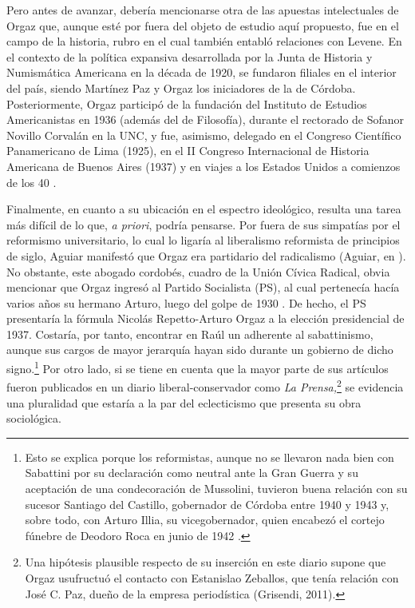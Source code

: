 Pero antes de avanzar, debería mencionarse otra de las apuestas intelectuales de Orgaz que, aunque esté por fuera del objeto de estudio aquí propuesto, fue en el campo de la historia, rubro en el cual también entabló relaciones con Levene. En el contexto de la política expansiva desarrollada por la Junta de Historia y Numismática Americana en la década de 1920, se fundaron filiales en el interior del país, siendo Martínez Paz y Orgaz los iniciadores de la de Córdoba. Posteriormente, Orgaz participó de la fundación del Instituto de Estudios Americanistas en 1936 (además del de Filosofía), durante el rectorado de Sofanor Novillo Corvalán en la UNC, y fue, asimismo, delegado en el Congreso Científico Panamericano de Lima (1925), en el II Congreso Internacional de Historia Americana de Buenos Aires (1937) y en viajes a los Estados Unidos a comienzos de los 40 \parencite{1528-REQUENA2010}.

Finalmente, en cuanto a su ubicación en el espectro ideológico, resulta una tarea más difícil de lo que, \emph{a priori}, podría pensarse. Por fuera de sus simpatías por el reformismo universitario, lo cual lo ligaría al liberalismo reformista de principios de siglo, Aguiar manifestó que Orgaz era partidario del radicalismo (Aguiar, en \cite{1544-ORGAZ1960}). No obstante, este abogado cordobés, cuadro de la Unión Cívica Radical, obvia mencionar que Orgaz ingresó al Partido Socialista (PS), al cual pertenecía hacía varios años su hermano Arturo, luego del golpe de 1930 \parencite{1507-TCACH2012}. De hecho, el PS presentaría la fórmula Nicolás Repetto-Arturo Orgaz a la elección presidencial de 1937. Costaría, por tanto, encontrar en Raúl un adherente al sabattinismo, aunque sus cargos de mayor jerarquía hayan sido durante un gobierno de dicho signo.\footnote{Esto se explica porque los reformistas, aunque no se llevaron nada bien con Sabattini por su declaración como neutral ante la Gran Guerra y su aceptación de una condecoración de Mussolini, tuvieron buena relación con su sucesor Santiago del Castillo, gobernador de Córdoba entre 1940 y 1943 y, sobre todo, con Arturo Illia, su vicegobernador, quien encabezó el cortejo fúnebre de Deodoro Roca en junio de 1942 \parencite{1624-FERRERO1984}.} Por otro lado, si se tiene en cuenta que la mayor parte de sus artículos fueron publicados en un diario liberal-conservador como \emph{La Prensa,}\footnote{Una hipótesis plausible respecto de su inserción en este diario supone que Orgaz usufructuó el contacto con Estanislao Zeballos, que tenía relación con José C. Paz, dueño de la empresa periodística (Grisendi, 2011).} se evidencia una pluralidad que estaría a la par del eclecticismo que presenta su obra sociológica.

